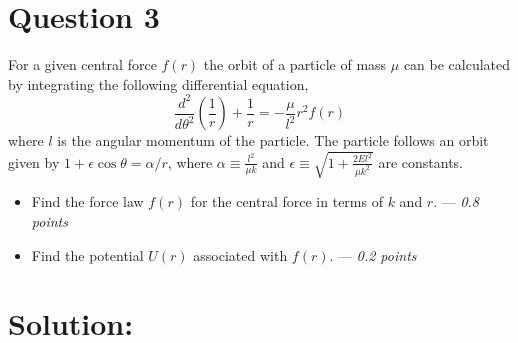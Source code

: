 \section*{Question 3}
For a given central force $f(r)$ the orbit of a particle of mass $\mu$ can be calculated by integrating the following differential equation,
\begin{equation*}
    \dfrac{d^2}{d\theta^2}\left(\frac{1}{r}\right)+\frac{1}{r}=-\frac{\mu}{l^2}r^2f(r)
\end{equation*}
where $l$ is the angular momentum of the particle. The particle follows an orbit given by $1+\epsilon\cos\theta=\alpha/r$, where $\alpha\equiv \frac{l^2}{\mu k}$ and $\epsilon \equiv \sqrt{1+\frac{2El^2}{\mu k^2}}$ are constants.

\begin{itemize}
    \item[\textbf{a.}] Find the force law $f(r)$ for the central force in terms of $k$ and $r$. --- \textit{0.8 points}
    \item[\textbf{b.}] Find the potential $U(r)$ associated with $f(r)$. --- \textit{0.2 points}
\end{itemize}

\section*{Solution:}